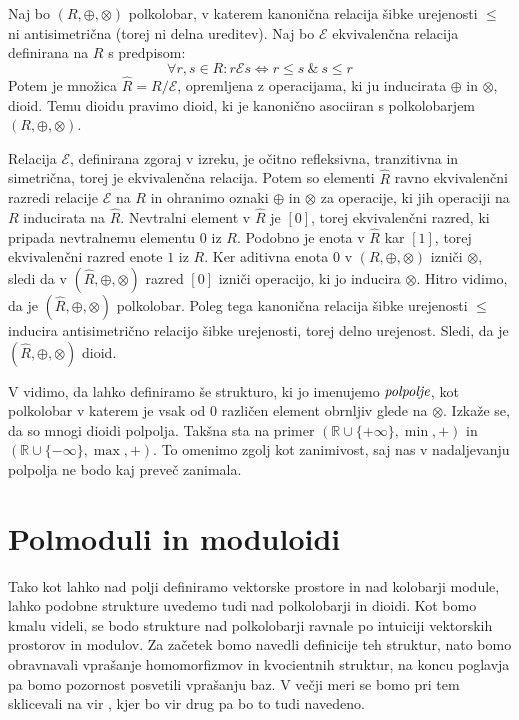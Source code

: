 \documentclass[mat1]{fmfdelo}
\newcommand{\R}{\mathbb{R}}
\newcommand{\pojem}[1]{\ensuremath{\emph{#1}}}
\begin{document}
\begin{trditev}
	Naj bo $(R, \oplus, \otimes)$ polkolobar, v katerem kanonična relacija šibke urejenosti  $\leq$ ni antisimetrična (torej ni delna ureditev). Naj bo $\mathcal{E}$ ekvivalenčna relacija definirana na $R$ s predpisom:
$$\forall r, s\in R: r\mathcal{E}s \iff r\leq s ~\&~ s \leq r$$
	Potem je množica $\widehat{R} = R / \mathcal{E}$, opremljena z operacijama, ki ju inducirata $\oplus$ in $\otimes$, dioid. Temu dioidu pravimo dioid, ki je kanonično asociiran s polkolobarjem $(R, \oplus, \otimes)$.
\end{trditev}
\begin{dokaz}
	Relacija $\mathcal{E}$, definirana zgoraj v izreku, je očitno refleksivna, tranzitivna in simetrična, torej je ekvivalenčna relacija. Potem so elementi $\widehat{R}$ ravno ekvivalenčni razredi relacije $\mathcal{E}$ na $R$ in ohranimo oznaki $\oplus$ in $\otimes$ za operacije, ki jih operaciji na $R$ inducirata na $\widehat{R}$. Nevtralni element v $\widehat{R}$ je $[0]$, torej ekvivalenčni razred, ki pripada nevtralnemu elementu $0$ iz $R$. Podobno je enota v $\widehat{R}$ kar $[1]$, torej ekvivalenčni razred enote $1$ iz $R$. Ker aditivna enota $0$ v $(R, \oplus, \otimes)$ izniči $\otimes$, sledi da v $(\widehat{R}, \oplus, \otimes)$ razred $[0]$ izniči operacijo, ki jo inducira $\otimes$. Hitro vidimo, da je $(\widehat{R}, \oplus, \otimes)$ polkolobar. Poleg tega kanonična relacija šibke urejenosti $\leq$ inducira antisimetrično relacijo šibke urejenosti, torej delno urejenost. Sledi, da je $(\widehat{R}, \oplus, \otimes)$ dioid.
\end{dokaz}
\begin{opomba}
	V \cite[poglavje 1, definicija 5.\,2.\,3.\,]{bib:Gondran} vidimo, da lahko definiramo še strukturo, ki jo imenujemo \pojem{polpolje}, kot polkolobar v katerem je vsak od $0$ različen element obrnljiv glede na $\otimes$. Izkaže se, da so mnogi dioidi polpolja. Takšna sta na primer $(\R\cup\{+\infty\}, \min, +)$ in $(\R\cup\{-\infty\}, \max, +)$. To omenimo zgolj kot zanimivost, saj nas v nadaljevanju polpolja ne bodo kaj preveč zanimala.
\end{opomba}

\section{Polmoduli in moduloidi}\label{sect:semimodule}
Tako kot lahko nad polji definiramo vektorske prostore in nad kolobarji module, lahko podobne strukture uvedemo tudi nad polkolobarji in dioidi. Kot bomo kmalu videli, se bodo strukture nad polkolobarji ravnale po intuiciji vektorskih prostorov in modulov. Za začetek bomo navedli definicije teh struktur, nato bomo obravnavali vprašanje homomorfizmov in kvocientnih struktur, na koncu poglavja pa bomo pozornost posvetili vprašanju baz. V večji meri se bomo pri tem sklicevali na vir \cite[poglavje 5.\,2.\,]{bib:Gondran}, kjer bo vir drug pa bo to tudi navedeno.
\end{document}
